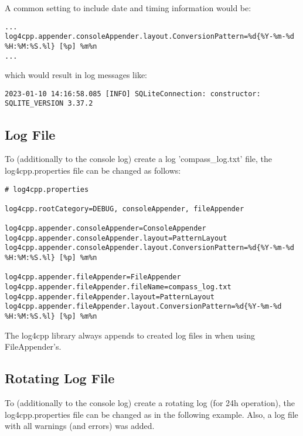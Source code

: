 A common setting to include date and timing information would be:

\begin{lstlisting}
...
log4cpp.appender.consoleAppender.layout.ConversionPattern=%d{%Y-%m-%d %H:%M:%S.%l} [%p] %m%n
...
\end{lstlisting}

which would result in log messages like:
\begin{lstlisting}
2023-01-10 14:16:58.085 [INFO] SQLiteConnection: constructor: SQLITE_VERSION 3.37.2
\end{lstlisting}


\subsection{Log File}

To (additionally to the console log) create a log 'compass\_log.txt' file, the log4cpp.properties file can be changed as follows:

\begin{lstlisting}
# log4cpp.properties

log4cpp.rootCategory=DEBUG, consoleAppender, fileAppender

log4cpp.appender.consoleAppender=ConsoleAppender
log4cpp.appender.consoleAppender.layout=PatternLayout
log4cpp.appender.consoleAppender.layout.ConversionPattern=%d{%Y-%m-%d %H:%M:%S.%l} [%p] %m%n

log4cpp.appender.fileAppender=FileAppender
log4cpp.appender.fileAppender.fileName=compass_log.txt
log4cpp.appender.fileAppender.layout=PatternLayout
log4cpp.appender.fileAppender.layout.ConversionPattern=%d{%Y-%m-%d %H:%M:%S.%l} [%p] %m%n
\end{lstlisting}

The log4cpp library always appends to created log files in when using FileAppender's.


\subsection{Rotating Log File}
\label{sec:appendix_logging_rotate}

To (additionally to the console log) create a rotating log (for 24h operation), the log4cpp.properties file can be changed as in the following example. Also, a log file with all warnings (and errors) was added.

